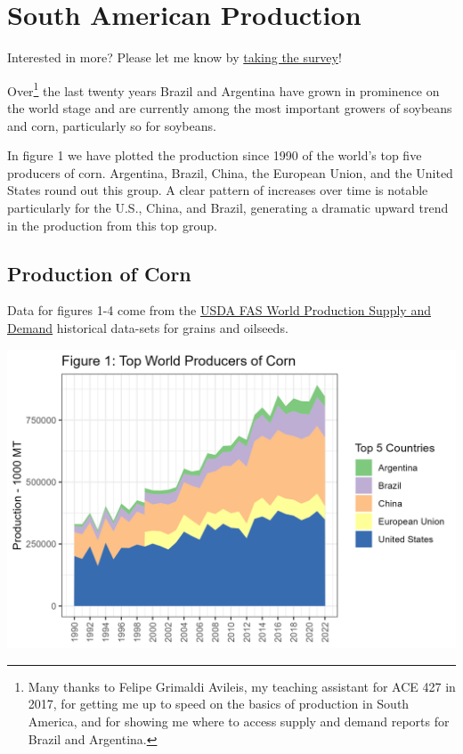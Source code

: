 \documentclass[
  letterpaper,
  DIV=11,
  numbers=noendperiod]{scrreprt}
\begin{document}

\hypertarget{south-american-production}{%
\chapter{South American Production}\label{south-american-production}}

{Interested in more? Please let me know by}
\href{https://forms.gle/Q3VByCQZHjfQSy9D7}{taking the survey}!

Over\footnote{Many thanks to Felipe Grimaldi Avileis, my teaching
  assistant for ACE 427 in 2017, for getting me up to speed on the
  basics of production in South America, and for showing me where to
  access supply and demand reports for Brazil and Argentina.} the last
twenty years Brazil and Argentina have grown in prominence on the world
stage and are currently among the most important growers of soybeans and
corn, particularly so for soybeans.

In figure 1 we have plotted the production since 1990 of the world's top
five producers of corn. Argentina, Brazil, China, the European Union,
and the United States round out this group. A clear pattern of increases
over time is notable particularly for the U.S., China, and Brazil,
generating a dramatic upward trend in the production from this top
group.

\hypertarget{production-of-corn}{%
\section{Production of Corn}\label{production-of-corn}}

Data for figures 1-4 come from the
\href{https://apps.fas.usda.gov/psdonline/app/index.html\#/app/downloads}{USDA
FAS World Production Supply and Demand} historical data-sets for grains
and oilseeds.

\includegraphics{assets/SouthAmericanProduction_TopProdCorn.png}
\end{document}
